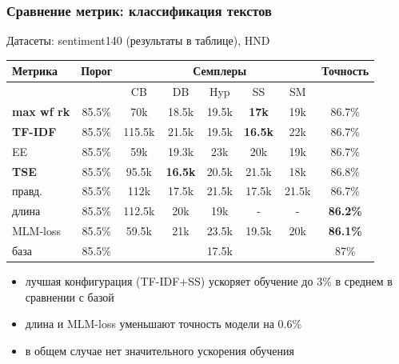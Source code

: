\documentclass{beamer}
\begin{document}
\begin{frame}
	\frametitle{Сравнение метрик: классификация текстов}
	
	Датасеты: sentiment140 (результаты в таблице), HND
	\begin{table}
		\begin{tabular}{|l|c|ccccc|c|}
			\hline
			Метрика & Порог & & \multicolumn{3}{c}{Семплеры} & & Точность\\
			\hline
			& & CB & DB & Hyp & SS & SM & \\
			\hline
			{\bf max wf rk} & 85.5\% & 70k & 18.5k & 19.5k & {\bf 17k} & 19k & 86.7\% \\
			{\bf TF-IDF} & 85.5\% & 115.5k & 21.5k & 19.5k & {\bf 16.5k} & 22k & 86.7\% \\
			EE & 85.5\% & 59k & 19.3k & 23k & 20k & 19k & 86.7\% \\
			{\bf TSE} & 85.5\% & 95.5k & {\bf 16.5k} & 20.5k & 21.5k & 18k & 86.8\% \\
			правд. & 85.5\% & 112k & 17.5k & 21.5k & 17.5k & 21.5k & 86.7\% \\
			длина & 85.5\% & 112.5k & 20k & 19k & - & - & {\bf 86.2\%} \\
			MLM-loss & 85.5\% & 59.5k & 21k & 23.5k & 19.5k & 20k & {\bf 86.1\%} \\
			\hline
			база & 85.5\% & & & 17.5k & & & 87\% \\
			\hline
		\end{tabular}
	\end{table}
	\begin{itemize}
		\item лучшая конфигурация (TF-IDF+SS) ускоряет обучение до 3\% в среднем в сравнении с базой
		\item длина и MLM-loss уменьшают точность модели на 0.6\%
		\item в общем случае нет значительного ускорения обучения
	\end{itemize}
\end{frame}
\end{document}
